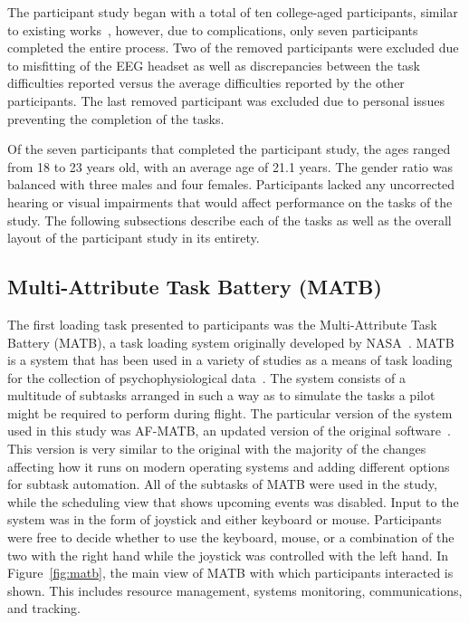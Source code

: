 \documentclass[11pt]{article}
\begin{document}

The participant study began with a total of ten college-aged participants, similar to existing works~\cite{Ting,Wang_R,Wilson_2010, Yin, Zhang}, however, due to complications, only seven participants completed the entire process. 
Two of the removed participants were excluded due to misfitting of the EEG headset as well as discrepancies between the task difficulties reported versus the average difficulties reported by the other participants. The last removed participant was excluded due to personal issues preventing the completion of the tasks.

Of the seven participants that completed the participant study, the ages ranged from 18 to 23 years old, with an average age of 21.1 years. The gender ratio was balanced with three males and four females. Participants lacked any uncorrected hearing or visual impairments that would affect performance on the tasks of the study. 
The following subsections describe each of the tasks as well as the overall layout of the participant study in its entirety.
	
	\subsection{Multi-Attribute Task Battery (MATB)}
	The first loading task presented to participants was the Multi-Attribute Task Battery (MATB), a task loading system originally developed by NASA~\cite{Comstock}. MATB is a system that has been used in a variety of studies as a means of task loading for the collection of psychophysiological data~\cite{Wilson, Smith, Wang_Z}. The system consists of a multitude of subtasks arranged in such a way as to simulate the tasks a pilot might be required to perform during flight. The particular version of the system used in this study was AF-MATB, an updated version of the original software~\cite{Estepp}. This version is very similar to the original with the majority of the changes affecting how it runs on modern operating systems and adding different options for subtask automation. All of the subtasks of MATB were used in the study, while the scheduling view that shows upcoming events was disabled. Input to the system was in the form of joystick and either keyboard or mouse. Participants were free to decide whether to use the keyboard, mouse, or a combination of the two with the right hand while the joystick was controlled with the left hand. In Figure~\ref{fig:matb}, the main view of MATB with which participants interacted is shown. This includes resource management, systems monitoring, communications, and tracking. 
	
\end{document}
